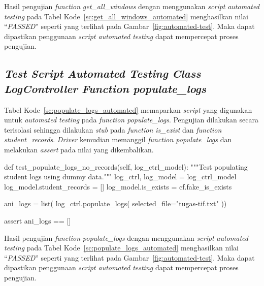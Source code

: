 \par\null\par
Hasil pengujian \emph{function} \emph{get\_all\_windows} dengan menggunakan
\emph{script} \emph{automated testing} pada Tabel
Kode~\ref{sc:get_all_windows_automated} menghasilkan nilai ``\emph{PASSED}''
seperti yang terlihat pada Gambar~\ref{fig:automated-test}. Maka dapat
dipastikan penggunaan \emph{script automated testing} dapat mempercepat proses
pengujian.

\subsection{\emph{Test Script} \emph{Automated Testing} \emph{Class} \emph{LogController}
  \emph{Function} \emph{populate\_logs}}

Tabel Kode~\ref{sc:populate_logs_automated} memaparkan \emph{script}
yang digunakan untuk \emph{automated testing} pada \emph{function
  populate\_logs}. Pengujian dilakukan secara terisolasi sehingga
dilakukan \emph{stub} pada \emph{function is\_exist} dan \emph{function
  student\_records}. \emph{Driver} kemudian memanggil \emph{function
  populate\_logs} dan melakukan \emph{assert} pada nilai yang
dikembalikan.

\par\null\par
\begin{code}
\begin{ignasicblock}[title=populate\_logs,minted language=Python]
def test_populate_logs_no_records(self, log_ctrl_model):
  """Test populating student logs using dummy data."""
  log_ctrl, log_model = log_ctrl_model
  log_model.student_records = []
  log_model.is_exists = cf.fake_is_exists

  ani_logs = list(
    log_ctrl.populate_logs(
      selected_file="tugas-tif.txt"
    ))

  assert ani_logs == []
\end{ignasicblock}
  \label{sc:populate_logs_automated}
\end{code}

\par\null\par
Hasil pengujian \emph{function} \emph{populate\_logs} dengan menggunakan
\emph{script} \emph{automated testing} pada Tabel
Kode~\ref{sc:populate_logs_automated} menghasilkan nilai ``\emph{PASSED}''
seperti yang terlihat pada Gambar~\ref{fig:automated-test}. Maka dapat
dipastikan penggunaan \emph{script automated testing} dapat mempercepat proses
pengujian.


